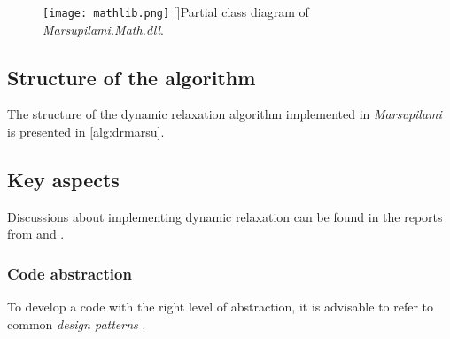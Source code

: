 \begin{figure}[t]
     	\centering
	\texttt{[image: mathlib.png]}
	[]{Partial class diagram of \textit{Marsupilami.Math.dll}.}
	\label{fig:mathlib}
\end{figure}


\subsection{Structure of the algorithm}
The structure of the dynamic relaxation algorithm implemented in \emph{Marsupilami} is presented in \cref{alg:drmarsu}.

\IncMargin{2em}
\begin{figure}[p]
\begin{fullpage}
	
\end{fullpage}
\end{figure}
\DecMargin{2em}


\subsection{Key aspects}
Discussions about implementing dynamic relaxation can be found in the reports from  and .


\subsubsection{Code abstraction}
To develop a code with the right level of abstraction, it is advisable to refer to common \emph{design patterns} \cite{Bishop2008, Clune2012}.


